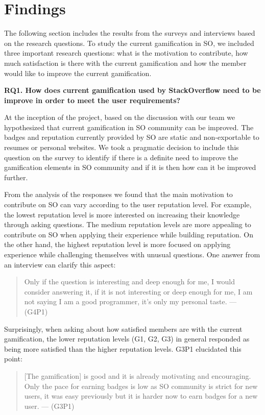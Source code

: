 \documentclass{sigchi}
\begin{document}
\section{Findings}

The following section includes the results from the surveys and interviews based on the research questions. To study the current gamification in SO, we included three important research questions: what is the motivation to contribute, how much satisfaction is there with the current gamification and how the member would like to improve the current gamification.

\textbf{RQ1. How does current gamification used by StackOverflow need to be improve in order to meet the user requirements?}

At the inception of the project, based on the discussion with our team we hypothesized that current gamification in SO community can be improved. The badges and reputation currently provided by SO are static and non-exportable to resumes or personal websites. We took a pragmatic decision to include this question on the survey to identify if there is a definite need to improve the gamification elements in SO community and if it is then how can it be improved further.

From the analysis of the responses we found that the main motivation to contribute on SO can vary according to the user reputation level. For example, the lowest reputation level is more interested on increasing their knowledge through asking questions. The medium reputation levels are more appealing to contribute on SO when applying their experience while building reputation. On the other hand, the highest reputation level is more focused on applying experience while challenging themselves with unusual questions. One answer from an interview can clarify this aspect:

\begin{quote}
Only if the question is interesting and deep enough for me, I would consider answering it, if it is not interesting or deep enough for me, I am not saying I am a good programmer, it’s only my personal taste. --- (G4P1)
\end{quote}

Surprisingly, when asking about how satisfied members are with the current gamification, the lower reputation levels (G1, G2, G3) in general responded as being more satisfied than the higher reputation levels. G3P1 elucidated this point:

\begin{quote}
[The gamification] is good and it is already motivating and encouraging. Only the pace for earning badges is low as SO community is strict for new users, it was easy previously but it is harder now to earn badges for a new user. --- (G3P1)
\end{quote}
\end{document}
